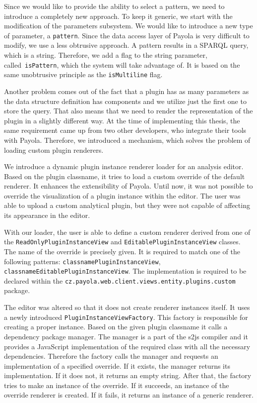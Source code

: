 Since we would like to provide the ability to select a pattern, we need to 
introduce a completely new approach. To keep it generic, we start with the 
modification of the parameters subsystem. We would like to introduce a new type 
of parameter, a \texttt{pattern}. Since the data access layer of Payola is very 
difficult to modify, we use a less obtrusive approach. A pattern results in a 
SPARQL query, which is a string. Therefore, we add a flag to the string 
parameter, called~\texttt{isPattern}, which the system will take advantage of. It 
is based on the same unobtrusive principle as the \texttt{isMultiline} flag.

Another problem comes out of the fact that a plugin has as many parameters as 
the data structure definition has components and we utilize just the first one 
to store the query. That also means that we need to render the representation 
of the plugin in a slightly different way. At the time of implementing this 
thesis, the same requirement came up from two other developers, who integrate their 
tools with Payola. Therefore, we introduced a mechanism, which solves the 
problem of loading custom plugin renderers.

We introduce a dynamic plugin instance renderer loader for an analysis editor. 
Based on the plugin classname, it tries to load a custom override of the default 
renderer. It enhances the extensibility of Payola. Until now, it was not 
possible to override the visualization of a plugin instance within the editor. The 
user was able to upload a custom analytical plugin, but they were not capable of affecting its
appearance in the editor.

With our loader, the user is able to define a custom renderer derived from 
one of the \texttt{ReadOnlyPlugin\allowbreak InstanceView} and \texttt{EditablePlugin\allowbreak InstanceView} 
classes. The name of the override is precisely given. It is required to match one 
of the following patterns: \texttt{{classname}\allowbreak PluginInstanceView},
\texttt{{classname}Editable\allowbreak PluginInstanceView}. The implementation is required to
be declared within the \texttt{cz.\allowbreak payola.\allowbreak web.\allowbreak client.\allowbreak views.\allowbreak entity.\allowbreak plugins.\allowbreak custom} package.

The editor was altered so that it does not create renderer instances itself. It 
uses a newly introduced \texttt{PluginInstance\allowbreak ViewFactory}. This 
factory is responsible for creating a proper instance. Based on the given plugin 
classname it calls a dependency package manager. The manager is a part of the 
s2js compiler and it provides a JavaScript implementation of the required class
with all the necessary dependencies. Therefore the factory calls the manager and 
requests an implementation of a specified override. If it exists, the manager 
returns its implementation. If it does not, it returns an empty string. After 
that, the factory tries to make an instance of the override. If it succeeds, an 
instance of the override renderer is created. If it fails, it returns an 
instance of a generic renderer. 
 
